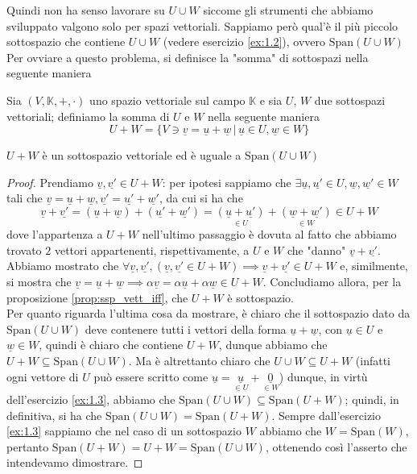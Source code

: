 Quindi non ha senso lavorare su $U \cup W$ siccome gli strumenti che abbiamo sviluppato valgono solo per spazi vettoriali. Sappiamo però qual'è il più piccolo sottospazio che contiene $U \cup W$ (vedere esercizio \ref{ex:1.2}), ovvero $\text{Span}(U \cup W)$
Per ovviare a questo problema, si definisce la "somma" di sottospazi nella seguente maniera
\begin{definition}
    Sia $(V, \mathbb{K}, +, \cdot)$ uno spazio vettoriale sul campo $\mathbb{K}$ e sia $U$, $W$ due sottospazi vettoriali; definiamo la somma di $U$ e $W$ nella seguente maniera
    $$
        U + W = \{ V \ni \underline{v} = \underline{u} + \underline{w} \, \big| \, \underline{u} \in U, \underline{w} \in W \}
    $$
\end{definition}
\begin{prop}
    \label{prop:sum_is_ssp}
    $U + W$ è un sottospazio vettoriale ed è uguale a $\text{Span}(U \cup W)$
\end{prop}
\begin{proof}
    Prendiamo $\underline{v}, \underline{v'} \in U + W$: per ipotesi sappiamo che $\exists \underline{u}, \underline{u'} \in U, \underline{w}, \underline{w'} \in W$ tali che $\underline{v} = \underline{u} + \underline{w}, \underline{v'} = \underline{u'} + \underline{w'}$, da cui si ha che
    $$
        \underline{v} + \underline{v'} = (\underline{u} + \underline{w}) + (\underline{u'} + \underline{w'}) = \underset{\in U}{(\underline{u} + \underline{u'})} + \underset{\in W}{(\underline{w} + \underline{w'})} \in U + W
    $$
    dove l'appartenza a $U + W$ nell'ultimo passaggio è dovuta al fatto che abbiamo trovato $2$ vettori appartenenti, rispettivamente, a $U$ e $W$ che "danno" $\underline{v} + \underline{v'}$. Abbiamo mostrato che $\forall \underline{v}, \underline{v'}, (\underline{v}, \underline{v'} \in U + W) \implies \underline{v} + \underline{v'} \in U + W$ e, similmente, si mostra che
    $\underline{v} = \underline{u} + \underline{w} \implies \alpha \underline{v} = \alpha \underline{u} + \alpha \underline{w} \in U + W$. Concludiamo allora, per la proposizione \ref{prop:ssp_vett_iff}, che $U + W$ è sottospazio. \\
    Per quanto riguarda l'ultima cosa da mostrare, è chiaro che il sottospazio dato da $\text{Span}(U \cup W)$ deve contenere tutti i vettori della forma $\underline{u} + \underline{w}$, con $\underline{u} \in U$ e $\underline{w} \in W$, quindi è chiaro che contiene $U + W$, dunque abbiamo che $U + W \subseteq \text{Span}(U \cup W)$. Ma è altrettanto chiaro che $U \cup W \subseteq U + W$ (infatti ogni vettore di $U$ può essere scritto come $\underline{u} = \underset{\in U}{\underline{u}} + \underset{\in W}{\underline{0}}$) dunque, in virtù dell'esercizio \ref{ex:1.3}, abbiamo che $\text{Span}(U \cup W) \subseteq \text{Span}(U + W)$; quindi, in definitiva, si ha che
    $\text{Span}(U \cup W) = \text{Span}(U + W)$. Sempre dall'esercizio \ref{ex:1.3} sappiamo che nel caso di un sottospazio $W$ abbiamo che $W = \text{Span}(W)$, pertanto $\text{Span}(U + W) = U + W = \text{Span}(U \cup W)$, ottenendo così l'asserto che intendevamo dimostrare. 
\end{proof}
